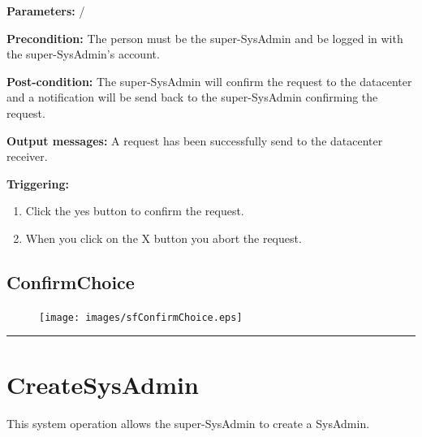 \begin{description}

\item \textbf{Parameters:} /
\item \textbf{Precondition:} The person must be the super-SysAdmin and be logged
in with the super-SysAdmin's account.
\item \textbf{Post-condition:} The super-SysAdmin will confirm the request to
the datacenter and a notification will be send back to the super-SysAdmin
confirming the request.
\item \textbf{Output messages:} A request has been successfully send to the
datacenter receiver.
\item \textbf{Triggering:} 
\begin{enumerate}
\item Click the yes button to confirm the request.
\item When you click on the X button you abort the request.
\end{enumerate}

 
\end{description}

\subsection{ConfirmChoice}

\begin{figure}[H]
\centering
\texttt{[image: images/sfConfirmChoice.eps]}
\caption{\label{overflow}}
\end{figure}


\hrule
\vspace{0.5cm}




\section{CreateSysAdmin}
\label{operation:createSysAdmin}
This system operation allows the super-SysAdmin to create a SysAdmin.

